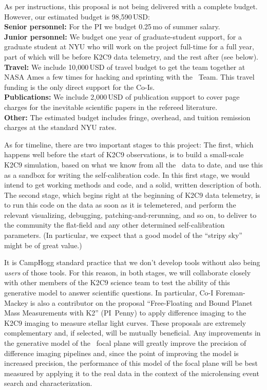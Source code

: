\documentclass[12pt,preprint]{aastex}
\begin{document}
As per instructions, this proposal is not being delivered with a complete
budget.
However, our estimated budget is 98,590\,USD:\\[1ex]
\textbf{Senior personnel:} For the PI we budget 0.25\,mo of summer salary.\\
\textbf{Junior personnel:} We budget one year of graduate-student support, for a
graduate student at NYU who will work on the project full-time for a full
year, part of which will be before K2C9 data telemetry, and the rest
after (see below).\\
\textbf{Travel:} We include 10,000\,USD of travel budget to get the team
together at NASA Ames a few times for hacking and sprinting with the
\ktwo\ Team.  This travel funding is the only direct support for the
Co-Is.\\
\textbf{Publications:} We include 2,000\,USD of publication support to cover page
charges for the inevitable scientific papers in the refereed
literature.\\
\textbf{Other:} The estimated budget includes fringe, overhead, and tuition
remission charges at the standard NYU rates.\vspace{1ex}

As for timeline, there are two important stages to this project:
The first, which happens well before the start of K2C9 observations,
is to build a small-scale K2C9 simulation, based on what we know from
all the \ktwo\ data to date, and use this as a sandbox for writing the
self-calibration code.
In this first stage, we would intend to get working methods and code,
and a solid, written description of both.
The second stage, which begins right at the beginning of K2C9 data
telemetry, is to run this code on the data as soon as it is
telemetered, and perform the relevant visualizing, debugging,
patching-and-rerunning, and so on, to deliver to the community the
flat-field and any other determined self-calibration parameters.
(In particular, we expect that a good model of the ``stripy sky''
might be of great value.)

It is CampHogg standard practice that we don't develop tools without
also being \emph{users} of those tools.
For this reason, in both stages, we will collaborate closely with other
members of the K2C9 science team to test the ability of this generative model
to answer scientific questions.
In particular, Co-I Foreman-Mackey is also a contributor on the proposal
``Free-Floating and Bound Planet Mass Measurements with K2'' (PI~Penny) to
apply difference imaging to the K2C9 imaging to measure stellar light curves.
These proposals are extremely complementary and, if selected, will be
mutually beneficial.
Any improvements in the generative model of the \ktwo\ focal plane will
greatly improve the precision of difference imaging pipelines and, since the
point of improving the model is increased precision, the performance of this
model of the focal plane will be best measured by applying it to the real data
in the context of the microlensing event search and characterization.
\end{document}
